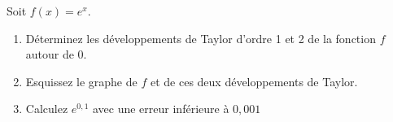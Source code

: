 
\begin{exercice}\label{exoDevel0002}

Soit $f(x)=e^x$.
\begin{enumerate}
\item
Déterminez les développements de Taylor d'ordre 1 et 2 de la fonction
$f$ autour de 0.
\item
Esquissez le graphe de $f$ et de ces deux développements de Taylor.
\item
Calculez $e^{0,1}$ avec une erreur inférieure à $0,001$
\end{enumerate}


\end{exercice}

